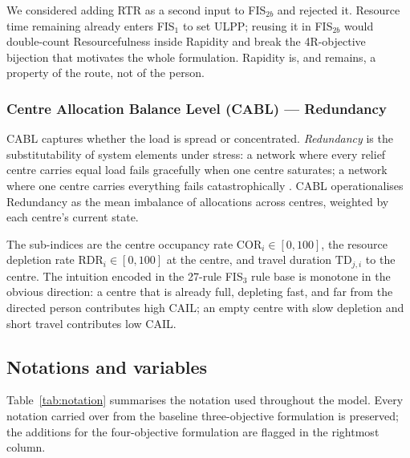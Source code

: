 \documentclass[applsci,article,submit,moreauthors,pdftex]{Definitions/mdpi}
\begin{document}
We considered adding RTR as a second input to FIS$_{2b}$ and rejected it.
Resource time remaining already enters FIS$_1$ to set ULPP; reusing it in
FIS$_{2b}$ would double-count Resourcefulness inside Rapidity and break the
4R-objective bijection that motivates the whole formulation. Rapidity is, and
remains, a property of the route, not of the person.

\subsubsection{Centre Allocation Balance Level (CABL) — Redundancy}

CABL captures whether the load is spread or concentrated. \emph{Redundancy} is
the substitutability of system elements under stress: a network where every
relief centre carries equal load fails gracefully when one centre saturates;
a network where one centre carries everything fails catastrophically
\cite{bruneau2003, christopher2004}. CABL operationalises Redundancy as the
mean imbalance of allocations across centres, weighted by each centre's
current state.

The sub-indices are the centre occupancy rate $\mathrm{COR}_i \in [0,100]$,
the resource depletion rate $\mathrm{RDR}_i \in [0,100]$ at the centre, and
travel duration $\mathrm{TD}_{j,i}$ to the centre. The intuition encoded in
the 27-rule FIS$_3$ rule base is monotone in the obvious direction: a centre
that is already full, depleting fast, and far from the directed person
contributes high CAIL; an empty centre with slow depletion and short travel
contributes low CAIL.

\subsection{Notations and variables}\label{sec:model-notation}

Table~\ref{tab:notation} summarises the notation used throughout the model.
Every notation carried over from the baseline three-objective formulation is
preserved; the additions for the four-objective formulation are flagged in the
rightmost column.
\end{document}

